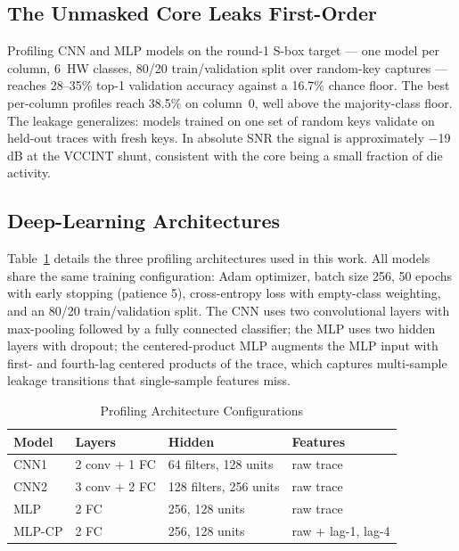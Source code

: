 \documentclass[conference]{IEEEtran}
\begin{document}
\subsection{The Unmasked Core Leaks First-Order}

Profiling CNN and MLP models on the round-1 S-box target — one
model per column, 6~HW classes, 80/20 train/validation split
over random-key captures — reaches 28--35\% top-1 validation
accuracy against a 16.7\% chance floor. The best per-column
profiles reach 38.5\% on column~0, well above the
majority-class floor. The leakage generalizes: models trained
on one set of random keys validate on held-out traces with
fresh keys. In absolute SNR the signal is approximately
$-$19\,dB at the VCCINT shunt, consistent with the core being a
small fraction of die activity.

\subsection{Deep-Learning Architectures}
\label{sec:arch}

Table~\ref{tab:arch} details the three profiling architectures
used in this work. All models share the same training
configuration: Adam optimizer, batch size 256, 50 epochs with
early stopping (patience 5), cross-entropy loss with empty-class
weighting, and an 80/20 train/validation split. The CNN uses two
convolutional layers with max-pooling followed by a fully
connected classifier; the MLP uses two hidden layers with
dropout; the centered-product MLP augments the MLP input with
first- and fourth-lag centered products of the trace, which
captures multi-sample leakage transitions that single-sample
features miss.

\begin{table}[htbp]
  \caption{Profiling Architecture Configurations}
  \label{tab:arch}
  \centering
  \begin{tabular}{llll}
    \toprule
    \textbf{Model} & \textbf{Layers} & \textbf{Hidden} &
    \textbf{Features} \\
    \midrule
    CNN1 & 2 conv + 1 FC & 64 filters, 128 units & raw trace \\
    CNN2 & 3 conv + 2 FC & 128 filters, 256 units & raw trace \\
    MLP & 2 FC & 256, 128 units & raw trace \\
    MLP-CP & 2 FC & 256, 128 units & raw + lag-1, lag-4 \\
    \bottomrule
  \end{tabular}
\end{table}
\end{document}
